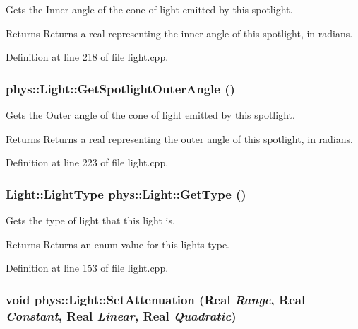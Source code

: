 Gets the Inner angle of the cone of light emitted by this spotlight. 

\begin{DoxyReturn}{Returns}
Returns a real representing the inner angle of this spotlight, in radians. 
\end{DoxyReturn}


Definition at line 218 of file light.cpp.

\hypertarget{classphys_1_1Light_a1f16eb63b48366c0cae7d139d51568d3}{
\subsubsection[{GetSpotlightOuterAngle}]{ phys::Light::GetSpotlightOuterAngle ()}}
\label{dc/df1/classphys_1_1Light_a1f16eb63b48366c0cae7d139d51568d3}


Gets the Outer angle of the cone of light emitted by this spotlight. 

\begin{DoxyReturn}{Returns}
Returns a real representing the outer angle of this spotlight, in radians. 
\end{DoxyReturn}


Definition at line 223 of file light.cpp.

\hypertarget{classphys_1_1Light_aede2c9db5c558e649a5de00ff6918ff4}{
\subsubsection[{GetType}]{\setlength{\rightskip}{0pt plus 5cm}Light::LightType phys::Light::GetType ()}}
\label{dc/df1/classphys_1_1Light_aede2c9db5c558e649a5de00ff6918ff4}


Gets the type of light that this light is. 

\begin{DoxyReturn}{Returns}
Returns an enum value for this lights type. 
\end{DoxyReturn}


Definition at line 153 of file light.cpp.

\hypertarget{classphys_1_1Light_a22294ff531c0767bc83e7702954e1277}{
\subsubsection[{SetAttenuation}]{\setlength{\rightskip}{0pt plus 5cm}void phys::Light::SetAttenuation ({\bf Real} {\em Range}, \/  {\bf Real} {\em Constant}, \/  {\bf Real} {\em Linear}, \/  {\bf Real} {\em Quadratic})}}
\label{dc/df1/classphys_1_1Light_a22294ff531c0767bc83e7702954e1277}


